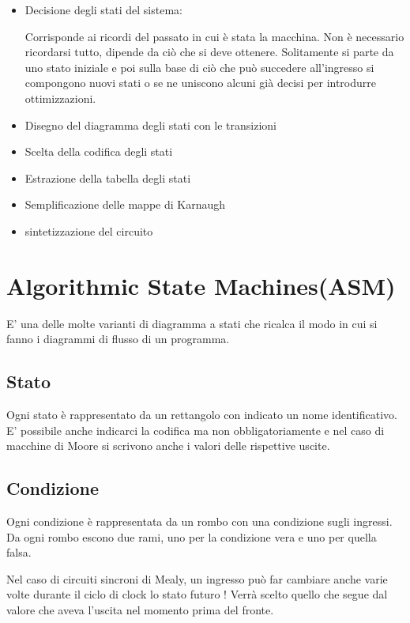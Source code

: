 \documentclass[a4paper]{book}
\begin{document}
\begin{itemize}
\item Decisione degli stati del sistema:

Corrisponde ai ricordi del passato in cui è stata la macchina. Non è necessario ricordarsi tutto, dipende da ciò che si deve ottenere.
Solitamente si parte da uno stato iniziale e poi sulla base di ciò che può succedere all'ingresso si compongono nuovi stati o se ne uniscono alcuni già decisi per introdurre ottimizzazioni.


\item Disegno del diagramma degli stati con le transizioni
\item Scelta della codifica degli stati
\item Estrazione della tabella degli stati
\item Semplificazione delle mappe di Karnaugh
\item sintetizzazione del circuito

\end{itemize}

\section{Algorithmic State Machines(ASM)}

E' una delle molte varianti di diagramma a stati che ricalca il modo in cui si fanno i diagrammi di flusso di un programma.

\subsection*{Stato}

Ogni stato è rappresentato da un rettangolo con indicato un nome identificativo.
E' possibile anche indicarci la codifica ma non obbligatoriamente e nel caso di macchine di Moore si scrivono anche i valori delle rispettive uscite.


\subsection*{Condizione}

Ogni condizione è rappresentata da un rombo con una condizione sugli ingressi.
Da ogni rombo escono due rami, uno per la condizione vera e uno per quella falsa.

Nel caso di circuiti sincroni di Mealy, un ingresso può far cambiare anche varie volte durante il ciclo di clock lo stato futuro !
Verrà scelto quello che segue dal valore che aveva l'uscita nel momento prima del fronte.
\end{document}
